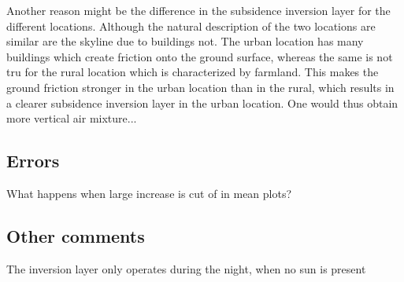 Another reason might be the difference in the subsidence inversion layer for the different locations. Although the natural description of the two locations are similar are the skyline due to buildings not. The urban location has many buildings which create friction onto the ground surface, whereas the same is not tru for the rural location which is characterized by farmland. This makes the ground friction stronger in the urban location than in the rural, which results in a clearer subsidence inversion layer in the urban location. One would thus obtain more vertical air mixture...

\subsection{Errors}
What happens when large increase is cut of in mean plots? 



\subsection{Other comments}
The inversion layer only operates during the night, when no sun is present



